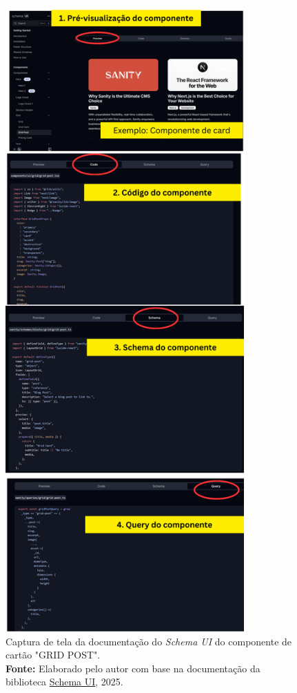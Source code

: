 \begin{figure}[H]
    \centering
    \includegraphics[height=24cm, keepaspectratio]{img/shcema ui qualidade.png}
    \caption{ Captura de tela da documentação do \textit{Schema UI} do componente de cartão "GRID POST". \\
        \textbf{Fonte:} Elaborado pelo autor com base na documentação da biblioteca \href{https://schemaui.com/docs/components/grid/grid-post}{Schema UI}, 2025.}
    \label{fig:schemaui}
\end{figure}



